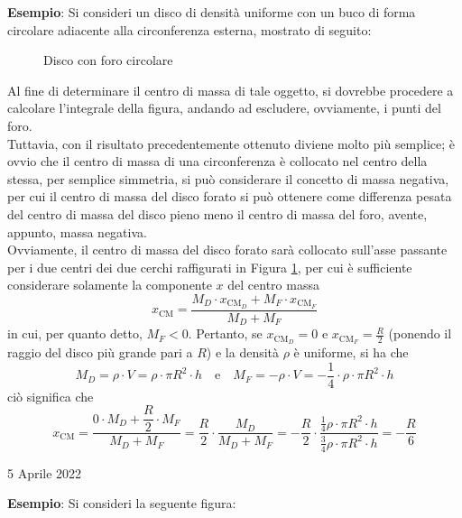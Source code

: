 \documentclass[a4paper]{extarticle}
\begin{document}
\vspace{1em}
\noindent
\textbf{Esempio}: Si consideri un disco di densità uniforme con un buco di forma circolare adiacente alla circonferenza esterna, mostrato di seguito:

\begin{figure}[H]
  \centering
  \caption{Disco con foro circolare}
  \label{fig:disco_foro_circolare}
\end{figure}

\noindent
Al fine di determinare il centro di massa di tale oggetto, si dovrebbe procedere a calcolare l'integrale della figura, andando ad escludere, ovviamente, i punti del foro.\\
Tuttavia, con il risultato precedentemente ottenuto diviene molto più semplice; è ovvio che il centro di massa di una circonferenza è collocato nel centro della stessa, per semplice simmetria, si può considerare il concetto di massa negativa, per cui il centro di massa del disco forato si può ottenere come differenza pesata del centro di massa del disco pieno meno il centro di massa del foro, avente, appunto, massa negativa.\\
Ovviamente, il centro di massa del disco forato sarà collocato sull'asse passante per i due centri dei due cerchi raffigurati in Figura \ref{fig:disco_foro_circolare}, per cui è sufficiente considerare solamente la componente $x$ del centro massa
\[x_{\text{CM}} = \frac{M_D \cdot x_{\text{CM}_D} + M_F \cdot x_{\text{CM}_F}}{M_D+M_F}\]
in cui, per quanto detto, $M_F<0$. Pertanto, se $x_{\text{CM}_D}=0$ e $x_{\text{CM}_F}=\frac{R}{2}$ (ponendo il raggio del disco più grande pari a $R$) e la densità $\rho$ è uniforme, si ha che
\[M_D=\rho \cdot V = \rho \cdot \pi R^2 \cdot h \hspace{1em} \text{e} \hspace{1em} M_F=-\rho \cdot V = -\frac{1}{4} \cdot \rho \cdot \pi R^2 \cdot h\]
ciò significa che
\[x_{\text{CM}} = \frac{0 \cdot M_D + \dfrac{R}{2} \cdot M_F}{M_D+M_F} = \frac{R}{2} \cdot \frac{M_D}{M_D+M_F} = -\frac{R}{2} \cdot \frac{\displaystyle{\frac{1}{4} \rho \cdot \pi R^2 \cdot h}}{\displaystyle{\frac{3}{4} \rho \cdot \pi R^2 \cdot h}} = -\frac{R}{6}\]

\newpage
\noindent
\begin{center}
  5 Aprile 2022
\end{center}
\textbf{Esempio}: Si consideri la seguente figura:
\end{document}
